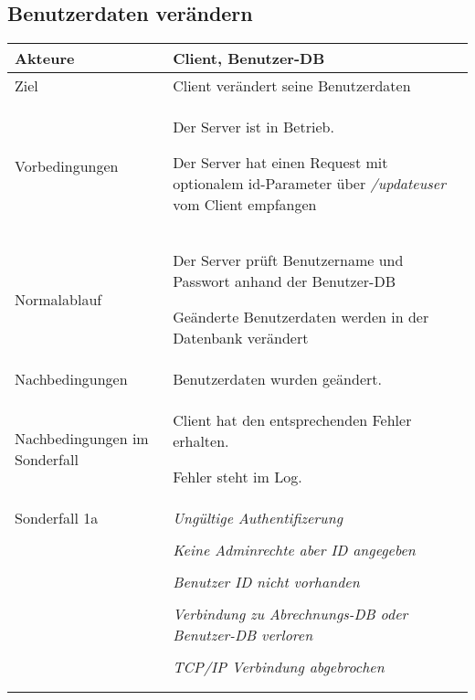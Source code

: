 \documentclass[a4paper,10pt,titlepage,parskip=true]{article}
\makeatletter
\newcommand\novspace{\@minipagetrue}
\newenvironment{owncompactitem}{%
\compactitem
}{%
\@finalstrut\@arstrutbox
\@nameuse{endcompactitem}%
\aftergroup\let\aftergroup\@finalstrut\aftergroup\@gobble
}
\newenvironment{owncompactenum}{%
\compactenum
}{%
\@finalstrut\@arstrutbox
\@nameuse{endcompactenum}%
\aftergroup\let\aftergroup\@finalstrut\aftergroup\@gobble
}
\newcommand{\usecase}[7]
{\subsection{#1}
\setlength{\extrarowheight}{2pt}
\begin{tabular}{|p{0.2\textwidth}|p{0.9\textwidth}|}
\hline
  Akteure & #2\\\hline
  Ziel & #3\\\hline
  Vorbedingungen & \novspace
  	\begin{owncompactitem}[-] #4 \end{owncompactitem} \\\hline
  Normalablauf & \vspace{-7pt}
  	\begin{owncompactenum}[1.] #6 \end{owncompactenum} \\\hline
  Nachbedingungen & \novspace
  	\begin{owncompactitem}[-] #5 \end{owncompactitem} \\\hline
  #7
\end{tabular}
}
\newcommand{\sonderfall}[4][\empty]
{
Sonderfall #2 & \vspace{-10pt}
	\textit{#3}
	\begin{owncompactenum}[{#2}.1] {#4} \end{owncompactenum}
  	\ifthenelse{\equal{#1}{\empty}}
    	{\\\hline} %
    	{\ensuremath{\rightarrow} #1 \\ [+1pt] \hline} %

}
\newcommand{\sondernachbedingung}[1]
{
Nachbedingungen im Sonderfall& \novspace
	\begin{owncompactitem}[-]
		#1
	\end{owncompactitem} \\\hline
}
\makeatother
\begin{document}
\usecase{Benutzerdaten verändern}{Client, Benutzer-DB}%
{Client verändert seine Benutzerdaten}%
{%
  \item Der Server ist in Betrieb.
  \item Der Server hat einen Request mit optionalem id-Parameter über \textit{/updateuser} vom Client empfangen
}
{%
  \item Benutzerdaten wurden geändert.
}
{%
  \item Der Server prüft Benutzername und Passwort anhand der Benutzer-DB
  \item Geänderte Benutzerdaten werden in der Datenbank verändert
}
{%
  \sondernachbedingung{
	\item Client hat den entsprechenden Fehler erhalten.
	\item Fehler steht im Log.
	}
	
	\sonderfall[Weiter mit normalem Betrieb]{1a}
    {Ungültige Authentifizerung}
    {
    \item Fehler wird ins Log geschrieben
  	\item Der Client erhält einen EAUTH Fehler mit HTTP-Status 401 Unauthorized
    }
     	\sonderfall[Weiter mit normalem Betrieb]{1b}
    {Keine Adminrechte aber ID angegeben}
    {
    \item Fehler wird ins Log geschrieben
  	\item Der Client erhält einen ENOTADMIN Fehler mit HTTP-Status 403 Forbidden
    }
    	\sonderfall[Weiter mit normalem Betrieb]{2a}
    {Benutzer ID nicht vorhanden}
    {
    \item Fehler wird ins Log geschrieben
  	\item Der Client erhält einen ENOID Fehler mit HTTP-Status 404 Not Found
    }
   	
  \sonderfall[Der Server nimmt keine weiteren Anfragen an bis Verbindung zur Datenbank wieder hergestellt.]{*}%
	{Verbindung zu Abrechnungs-DB oder Benutzer-DB verloren}%
  	{
	\item Der Fehler wird ins Log geschrieben
	\item Der Client erhält einen EDATABASE Fehler mit HTTP-Status 503 Service Unavailable
  	}

\sonderfall[Weiter mit normalem Betrieb]{**}%
	{TCP/IP Verbindung abgebrochen}%
	{
	\item Fehlermeldung wird ins Log geschrieben
	}
}
\end{document}
